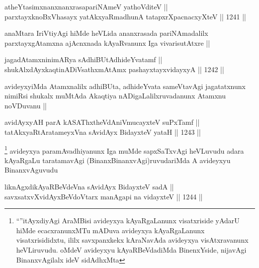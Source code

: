 \begin{shl}
atheYtasimxnanxnanxrasapariNAmeV yathoVditeV ||  \\
parxtayxknoBxVhasayx yatAkxyaRmadhunA tatapxrXpacnacxyXteV ||  1241 || 
\end{shl}

\begin{artha}
anaMtara IriVtiyAgi hiMde heVLida ananxrasada pariNAmadalilx parxtayxgAtamxna ajAcnxnada kAyaRvanunx Iga vivarisutAtxre ||
\end{artha}


\begin{shl}
jagadAtamxninimARya sAdhiBUtAdhideYvatamf || \\
shukAlxdAyxkaqtinADiVsathxmAtAmx pashayxtayxvidayxyA ||  1242 ||  
\end{shl}

\begin{artha}
avideyxyiMda Atamxnalilx adhiBUta, adhideYvata sameVtavAgi jagatatxnunx nimiRsi shukalx muMtAda Akaqtiya nADigaLalilxruvadanunx Atamxnu noVDuvanu ||
\end{artha}


\begin{shl}
avidAyxyAH parA kASAThx\s theVdAniVmucayxteV suPxTamf || \\
tatAkxyaRtAratameyxVna sA\s vidAyx BidayxteV yataH ||  1243 ||  
\end{shl}

\begin{artha}
\footnote{``\stext''itAyxdiyAgi AraMBisi avideyxya kAyaRgaLanunx visatxriside yAdarU hiMde ecacxranunxMTu mADuva avideyxya kAyaRgaLanunx visatxrisididxtu, ililx savxpanxkekx kAraNavAda avideyxya visAtxravanunx heVLiruvudu. oMdeV avideyxyu kAyaRBeVdadiMda BinenxYside, nijavAgi BinanxvAgilalx ideV sidAdhxMta}
avideyxya paramAvadhiyanunx Iga muMde sapxSaTxvAgi heVLuvudu adara kAyaRgaLu taratamavAgi (BinanxBinanxvAgi)ruvudariMda A avideyxyu BinanxvAguvudu
\end{artha}


\begin{shl}
liknAgxdikAyaRBeVdeVna sA\s vidAyx BidayxteV sadA || \\
savxsatxvXvidAyxBeVdoV\s tarx manAgapi na vidayxteV ||  1244 ||  
\end{shl}

